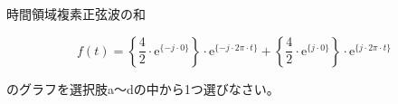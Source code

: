 時間領域複素正弦波の和

\[
f(t) =
   \left \{ \frac{4}{2} \cdot \textrm{e}^{\{-j  \cdot 0 \}} \right \} \cdot \textrm{e}^{\{-j \cdot 2\pi \cdot t \}}
+  \left \{ \frac{4}{2} \cdot \textrm{e}^{\{ j  \cdot 0 \}} \right \} \cdot \textrm{e}^{\{ j \cdot 2\pi \cdot t \}}
\]

\bigskip
\noindent  のグラフを選択肢a〜dの中から1つ選びなさい。
